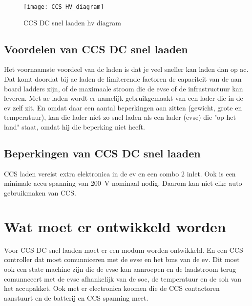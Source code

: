 \begin{figure}[h]
    \centering
    \texttt{[image: CCS\_HV\_diagram]}
    \caption{CCS DC snel laaden \ac{hv} diagram}
    \label{fig:CCS_HV_diagram}
\end{figure}

\subsection{Voordelen van CCS DC snel laaden}

Het voornaamste voordeel van \ac{dc} laden is dat je veel sneller kan laden dan
op \ac{ac}. Dat komt doordat bij \ac{ac} laden de limiterende factoren de
capaciteit van de aan board ladders zijn, of de maximaale stroom die de
\ac{evse} of de infrastructuur  kan leveren. Met \ac{ac} laden wordt er
namelijk gebruikgemaakt van een lader die in de \ac{ev} zelf zit. En omdat daar
een aantal beperkingen aan zitten (gewicht, grote en temperatuur), kan die
lader niet zo snel laden als een lader (\ac{evse}) die "op het land" staat,
omdat hij die beperking niet heeft. 

\subsection{Beperkingen van CCS DC snel laaden}

CCS laden vereist extra elektronica in de \ac{ev} en een combo 2 inlet. Ook is
een minimale accu spanning van \si{200\volt} nominaal nodig. Daarom kan niet elke auto
gebruikmaken van CCS.

\section{Wat moet er ontwikkeld worden}

Voor CCS DC snel laaden moet er een modum worden ontwikkeld. En een CCS
controller dat moet comunniceren met de \ac{evse} en het \ac{bms} van de
\ac{ev}. Dit moet ook een state machine zijn die de \ac{evse} kan aanroepen en
de laadstroom terug comunnceert met de \ac{evse} afhankelijk van de \ac{soc},
de temperatuur en de \ac{soh} van het accupakket. Ook met er electronica koomen
die de CCS contactoren aanstuurt en de batterij en CCS spanning meet.
